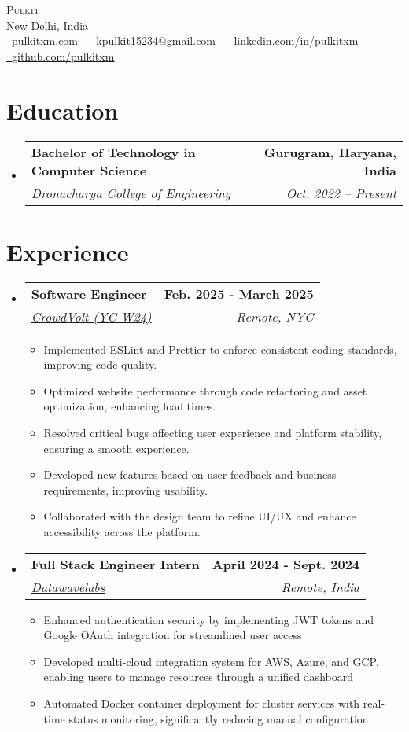 \documentclass[letterpaper,11pt]{article}
\makeatletter
\newcommand{\resumeItem}[1]{
  \item{
    {#1 \vspace{-2pt}}
  }
}
\newcommand{\resumeSubheading}[4]{
  \vspace{-2pt}\item
    \begin{tabular*}{1.0\textwidth}[t]{l@{\extracolsep{\fill}}r}
      \textbf{#1} & \textbf{ #2} \\
      \textit{#3} & \textit{ #4} \\
    \end{tabular*}\vspace{-7pt}
}
\newcommand{\resumeSubHeadingListStart}{\begin{itemize}[leftmargin=0.0in, label={}]}
\newcommand{\resumeSubHeadingListEnd}{\end{itemize}}
\newcommand{\resumeItemListStart}{\begin{itemize}}
\newcommand{\resumeItemListEnd}{\end{itemize}\vspace{-5pt}}
\makeatother
\begin{document}
\begin{center}
	{\Huge \scshape Pulkit} \\ \vspace{3pt}
	New Delhi, India \\ \vspace{3pt}
	\small
	\href{https://pulkitxm.com/}{\raisebox{-0.2\height}\faLink\ \underline{pulkitxm.com}} ~
	\href{mailto:kpulkit15234@gmail.com}{\raisebox{-0.2\height}\faEnvelope\ \underline{kpulkit15234@gmail.com}} ~
	\href{https://www.linkedin.com/in/pulkitxm}{\raisebox{-0.2\height}\faLinkedin\ \underline{linkedin.com/in/pulkitxm}} ~
	\href{https://github.com/Pulkitxm}{\raisebox{-0.2\height}\faGithub\ \underline{github.com/pulkitxm}}
	\vspace{-8pt}
\end{center}

\section{Education}
\resumeSubHeadingListStart%
\resumeSubheading%
{Bachelor of Technology in Computer Science}{Gurugram, Haryana, India}
{Dronacharya College of Engineering}{Oct. 2022 – Present}
\resumeSubHeadingListEnd%

\section{Experience}
\resumeSubHeadingListStart%
\resumeSubheading%
{Software Engineer}{Feb. 2025 - March 2025}
{\href{https://www.crowdvolt.com}{CrowdVolt (YC W24)}}{Remote, NYC}
\resumeItemListStart%
\resumeItem{Implemented ESLint and Prettier to enforce consistent coding standards, improving code quality.}
\resumeItem{Optimized website performance through code refactoring and asset optimization, enhancing load times.}
\resumeItem{Resolved critical bugs affecting user experience and platform stability, ensuring a smooth experience.}
\resumeItem{Developed new features based on user feedback and business requirements, improving usability.}
\resumeItem{Collaborated with the design team to refine UI/UX and enhance accessibility across the platform.}
\resumeItemListEnd%
\resumeSubheading%
{Full Stack Engineer Intern}{April 2024 - Sept. 2024}
{\href{https://www.datawavelabs.io/}{Datawavelabs}}{Remote, India}
\resumeItemListStart%
\resumeItem{Enhanced authentication security by implementing JWT tokens and Google OAuth integration for streamlined user access}
\resumeItem{Developed multi-cloud integration system for AWS, Azure, and GCP, enabling users to manage resources through a unified dashboard}
\resumeItem{Automated Docker container deployment for cluster services with real-time status monitoring, significantly reducing manual configuration}
\resumeItemListEnd%
\resumeSubHeadingListEnd%
\vspace{-14pt}
\end{document}
